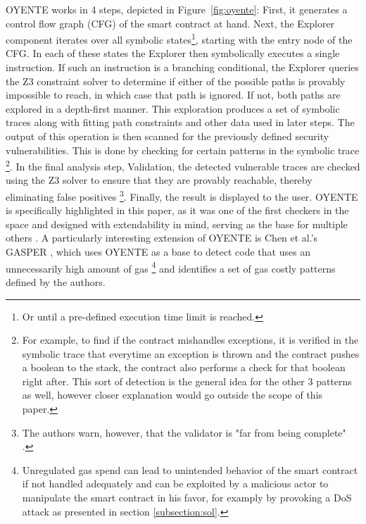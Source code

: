 \documentclass[letterpaper,twocolumn,10pt]{article}
\begin{document}
OYENTE works in 4 steps, depicted in Figure~\ref{fig:oyente}: First, it generates a control flow graph (CFG) of the smart contract at hand. Next, the Explorer component iterates over all symbolic states\footnote{Or until a pre-defined execution time limit is reached.}, starting with the entry node of the CFG. In each of these states the Explorer then symbolically executes a single instruction. If such an instruction is a branching conditional, the Explorer queries the Z3 constraint solver \cite{moura_bjorner_2008} to determine if either of the possible paths is provably impossible to reach, in which case that path is ignored. If not, both paths are explored in a depth-first manner. This exploration produces a set of symbolic traces along with fitting path constraints and other data used in later steps. The output of this operation is then scanned for the previously defined security vulnerabilities. This is done by checking for certain patterns in the symbolic trace \footnote{For example, to find if the contract mishandles exceptions, it is verified in the symbolic trace that everytime an exception is thrown and the contract pushes a boolean to the stack, the contract also performs a check for that boolean right after. This sort of detection is the general idea for the other 3 patterns as well, however closer explanation would go outside the scope of this paper.}. In the final analysis step, Validation, the detected vulnerable traces are checked using the Z3 solver to ensure that they are provably reachable, thereby eliminating false positives \footnote{The authors warn, however, that the validator is "far from being complete" \cite{luu_chu_olickel_saxena_hobor_2016}.}. Finally, the result is displayed to the user. OYENTE is specifically highlighted in this paper, as it was one of the first checkers in the space and designed with extendability in mind, serving as the base for multiple others \cite{zhou_hua_pi_sun_nomura_yamashita_kurihara_2018}\cite{albert_gordillo_livshits_rubio_sergey_2018}. A particularly interesting extension of OYENTE is Chen et al.'s GASPER \cite{chen_li_luo_zhang_2017}, which uses OYENTE as a base to detect code that uses an unnecessarily high amount of gas \footnote{Unregulated gas spend can lead to unintended behavior of the smart contract if not handled adequately and can be exploited by a malicious actor to manipulate the smart contract in his favor, for examply by provoking a DoS attack as presented in section \ref{subsection:sol}.} and identifies a set of gas costly patterns defined by the authors.
\end{document}
